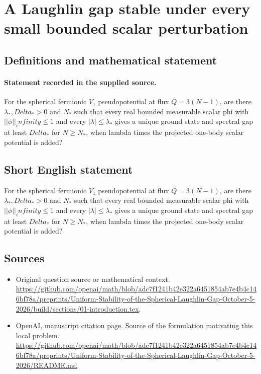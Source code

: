 \documentclass[11pt]{article}
\begin{document}
\section*{A Laughlin gap stable under every small bounded scalar perturbation}\label{30007231}
\subsection{Definitions and mathematical statement}
\paragraph{Statement recorded in the supplied source.}
For the spherical fermionic $V_1$ pseudopotential at flux $Q=3(N-1)$, are there $\lambda _*,Delta_*>0$ and $N_*$ such that every real bounded measurable scalar phi with $||\phi ||_infinity\leq 1$ and every $|\lambda |\leq \lambda _*$ gives a unique ground state and spectral gap at least $Delta_*$ for $N\geq N_*$, when lambda times the projected one-body scalar potential is added?
\subsection{Short English statement}
For the spherical fermionic $V_1$ pseudopotential at flux $Q=3(N-1)$, are there $\lambda _*,Delta_*>0$ and $N_*$ such that every real bounded measurable scalar phi with $||\phi ||_infinity\leq 1$ and every $|\lambda |\leq \lambda _*$ gives a unique ground state and spectral gap at least $Delta_*$ for $N\geq N_*$, when lambda times the projected one-body scalar potential is added?
\subsection{Sources}
\begin{itemize}
\item[S1] Original question source or mathematical context.
\url{https://github.com/openai/math/blob/adc7f1241b42e322a6451854ab7e4b4c146bf78a/preprints/Uniform-Stability-of-the-Spherical-Laughlin-Gap-October-5-2026/build/sections/01-introduction.tex}.
\item[S2] OpenAI, manuscript citation page. Source of the formulation motivating this local problem.
\url{https://github.com/openai/math/blob/adc7f1241b42e322a6451854ab7e4b4c146bf78a/preprints/Uniform-Stability-of-the-Spherical-Laughlin-Gap-October-5-2026/README.md}.
\end{itemize}
\end{document}
